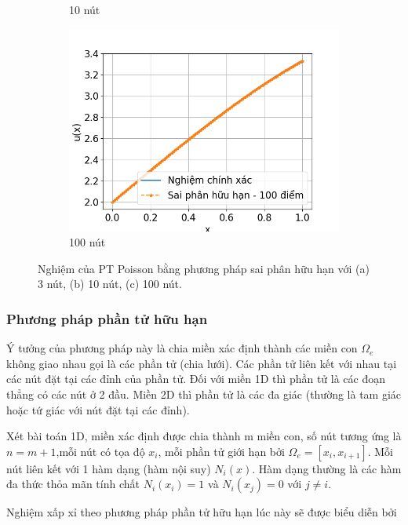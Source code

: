 \begin{figure}[htbp]
\begin{subfigure}[b]{0.3\linewidth}
        \caption{10 nút}
        \label{fig:SPHH_10p}
    \end{subfigure}\hfill
    \begin{subfigure}[b]{0.3\linewidth}
        \centering
        \includegraphics[width=\linewidth]{Tuan6/figure/SPHH_100p.png}
        \caption{100 nút}
        \label{fig:SPHH_100p}
    \end{subfigure}
    \caption{Nghiệm của PT Poisson bằng phương pháp sai phân hữu hạn với (a) 3 nút, (b) 10 nút, (c) 100 nút.}
    \label{fig_SPHHresults}
\end{figure}


\subsubsection{Phương pháp phần tử hữu hạn}

Ý tưởng của phương pháp này là chia miền xác định thành các miền con $\Omega_e$ không giao nhau gọi là các phần tử (chia lưới). Các phần tử liên kết với nhau tại các nút đặt tại các đỉnh của phần tử. Đối với miền 1D thì phần tử là các đoạn thẳng có các nút ở 2 đầu. Miền 2D thì phần tử là các đa giác (thường là tam giác hoặc tứ giác với nút đặt tại các đỉnh). 

Xét bài toán 1D, miền xác định được chia thành m miền con, số nút tương ứng là $n = m+1$,mỗi nút có tọa độ $x_i$, mỗi phần tử giới hạn bởi $\Omega_e = [x_i, x_{i+1}]$. Mỗi nút liên kết với 1 hàm dạng (hàm nội suy) $N_i(x)$. Hàm dạng thường là các hàm đa thức thỏa mãn tính chất $N_i(x_i) = 1$ và $N_i(x_j) = 0$ với $j \neq i$.

Nghiệm xấp xỉ theo phương pháp phần tử hữu hạn lúc này sẽ được biểu diễn bởi 

